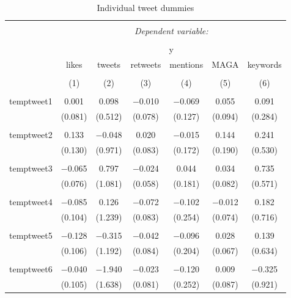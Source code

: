 
\begin{table}[!htbp] \centering 
  \caption{Individual tweet dummies} 
  \label{} 
\begin{tabular}{@{\extracolsep{5pt}}lcccccc} 
\\[-1.8ex]\hline 
\hline \\[-1.8ex] 
 & \multicolumn{6}{c}{\textit{Dependent variable:}} \\ 
\cline{2-7} 
\\[-1.8ex] & \multicolumn{6}{c}{y} \\ 
 & likes & tweets & retweets & mentions & MAGA & keywords \\ 
\\[-1.8ex] & (1) & (2) & (3) & (4) & (5) & (6)\\ 
\hline \\[-1.8ex] 
 temptweet1 & 0.001 & 0.098 & $-$0.010 & $-$0.069 & 0.055 & 0.091 \\ 
  & (0.081) & (0.512) & (0.078) & (0.127) & (0.094) & (0.284) \\ 
  & & & & & & \\ 
 temptweet2 & 0.133 & $-$0.048 & 0.020 & $-$0.015 & 0.144 & 0.241 \\ 
  & (0.130) & (0.971) & (0.083) & (0.172) & (0.190) & (0.530) \\ 
  & & & & & & \\ 
 temptweet3 & $-$0.065 & 0.797 & $-$0.024 & 0.044 & 0.034 & 0.735 \\ 
  & (0.076) & (1.081) & (0.058) & (0.181) & (0.082) & (0.571) \\ 
  & & & & & & \\ 
 temptweet4 & $-$0.085 & 0.126 & $-$0.072 & $-$0.102 & $-$0.012 & 0.182 \\ 
  & (0.104) & (1.239) & (0.083) & (0.254) & (0.074) & (0.716) \\ 
  & & & & & & \\ 
 temptweet5 & $-$0.128 & $-$0.315 & $-$0.042 & $-$0.096 & 0.028 & 0.139 \\ 
  & (0.106) & (1.192) & (0.084) & (0.204) & (0.067) & (0.634) \\ 
  & & & & & & \\ 
 temptweet6 & $-$0.040 & $-$1.940 & $-$0.023 & $-$0.120 & 0.009 & $-$0.325 \\ 
  & (0.105) & (1.638) & (0.081) & (0.252) & (0.087) & (0.921) \\ 

\end{tabular}
\end{table}
